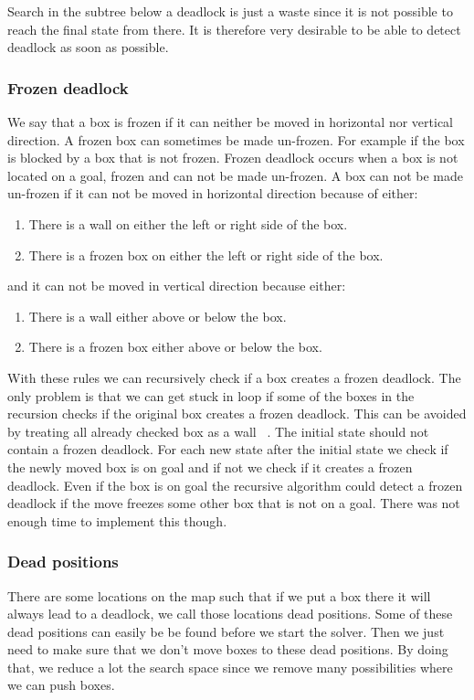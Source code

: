 \documentclass[a4paper,10pt]{article}
\begin{document}
        Search in the subtree below a deadlock is just a waste since it is not possible to reach the final state from there.  
        It is therefore very desirable to be able to detect deadlock as soon as possible.
	  \subsubsection{Frozen deadlock}
	    We say that a box is frozen if it can neither be moved in horizontal nor vertical direction.  
	    A frozen box can sometimes be made un-frozen.  For example if the box is blocked by a box that is not frozen.  
	    Frozen deadlock occurs when a box is not located on a goal, frozen and can not be made un-frozen.  
	    A box can not be made un-frozen if it can not be moved in horizontal direction because of either:
	
	    \begin{enumerate}[I]
                \item There is a wall on either the left or right side of the box.
                \item There is a frozen box on either the left or right side of the box.
            \end{enumerate}
            and it can not be moved in vertical direction because either: 
            \begin{enumerate}[I]
                \item There is a wall either above or below the box.
                \item There is a frozen box either above or below the box.
            \end{enumerate}
            With these rules we can recursively check if a box creates a frozen deadlock.  
            The only problem is that we can get stuck in loop if some of the boxes in the recursion checks if the original box creates a frozen deadlock.  
            This can be avoided by treating all already checked box as a wall ~\cite{frozen_deadlock}.    
            The initial state should not contain a frozen deadlock.  
            For each new state after the initial state we check if the newly moved box is on goal and if not we check if it creates a frozen deadlock. 
            Even if the box is on goal the recursive algorithm could detect a frozen deadlock if the move freezes some other box that is not on a goal.  
            There was not enough time to implement this though.
          \subsubsection{Dead positions}
            There are some locations on the map such that if we put a box there it will always lead to a deadlock, we call those locations dead positions.  
            Some of these dead positions can easily be be found before we start the solver. 
            Then we just need to make sure that we don’t move boxes to these dead positions. 
            By doing that, we reduce a lot the search space since we remove many possibilities where we can push boxes.
            
\end{document}
